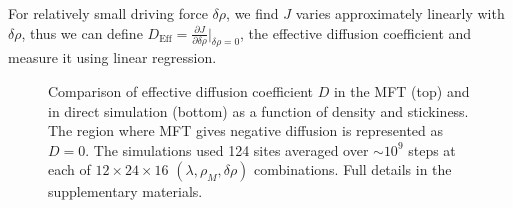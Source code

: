 \documentclass[
reprint,
 amsmath,amssymb,
 aps,
 prl
]{revtex4-1}
\newcommand{\partDeriv}[2]{\frac{\partial #1}{\partial #2}}
\begin{document}
For relatively small driving force $\delta\rho$, we find
 $J$ varies approximately
linearly with $\delta\rho$, thus we can define 
$D_\mathrm{Eff}=\partDeriv{J}{\delta\rho}\big|_{\delta\rho=0}$, the effective diffusion coefficient and measure it using linear regression.
\begin{figure}[h!]
\vspace{1em}
\caption{\label{fig:diffCoef} Comparison of effective diffusion
  coefficient $D$ in the MFT (top) and in direct simulation (bottom)
  as a function of density and stickiness.  The region where MFT gives
  negative diffusion is represented as $D=0$. The simulations used 124
  sites averaged over $\sim 10^9$ steps at each of $12 \times 24
  \times 16 $ $(\lambda, \rho_M, \delta \rho)$ combinations.  Full
  details in the supplementary materials.}


\end{figure}
\end{document}
